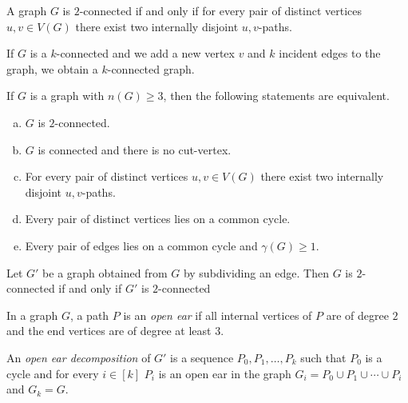 \begin{theorem}[Whitney]
    A graph $G$ is $2$-connected if and only if for every 
    pair of distinct vertices $u,v \in V(G)$ there 
    exist two internally disjoint $u,v$-paths.
\end{theorem}

\begin{lemma}[Expansion]
    If $G$ is a $k$-connected and we add a new vertex $v$ 
    and $k$ incident edges to the graph, we obtain a 
    $k$-connected graph.
\end{lemma}



\begin{theorem}
    If $G$ is a graph with $n(G) \ge 3$, then the following statements are equivalent.
    \begin{enumerate}[(a)]
        \item $G$ is $2$-connected.
        \item $G$ is connected and there is no cut-vertex.
        \item For every pair of distinct vertices $u,v \in V(G)$ there 
        exist two internally disjoint $u,v$-paths.
        \item Every pair of distinct vertices lies on a common cycle.
        \item Every pair of edges lies on a common cycle and $\gamma(G) \ge 1$.
    \end{enumerate}
\end{theorem}

\begin{lemma}[Subdivision]
    Let $G'$ be a graph obtained from $G$ by subdividing an edge. Then $G$ 
    is $2$-connected if and only if $G'$ is $2$-connected
\end{lemma}

\begin{definition}
    In a graph $G$, a path $P$ is an \emph{open ear} if all internal
    vertices of $P$ are of degree $2$ and the end vertices are of degree at least $3$.
\end{definition}

\begin{definition}
    An \emph{open ear decomposition} of $G'$ is a sequence $P_0, P_1, \dots, P_k$ such 
    that $P_0$ is a cycle and for every $i \in [k]$ $P_i$ is an open ear in 
    the graph $G_i = P_0 \cup P_1 \cup \cdots \cup P_i$ and $G_k = G$.
\end{definition}